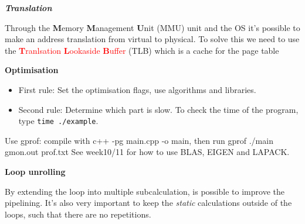 \documentclass[fontsize=8pt, a4paper, landscape, fleqn]{scrartcl}
\renewcommand{\section}[1]{%
    \noindent\colorbox{sectioncolor}{%
        \parbox{\dimexpr\columnwidth-2\fboxsep}{\color{white}\textbf{#1}}}%
    \vspace{0.5mm}%
}
\renewcommand{\subsection}[1]{%
    \noindent\colorbox{subsectioncolor}{%
        \parbox{\dimexpr\columnwidth-2\fboxsep}{\color{white}\textbf{#1}}}%
    \vspace{0.5mm}%
}
\renewcommand{\subsubsection}[1]{%
    \noindent\textbf{\textit{\color{subsectioncolor}#1}}%
    \vspace{1mm}%
}
\begin{document}
\begin{multicols*}{3}[\raggedcolumns]

    \subsubsection{Translation}
    Through the \textbf{M}emory \textbf{M}anagement \textbf{U}nit (MMU) unit and the OS it's possible to make an address translation from virtual to physical. To solve this we need to use the \textcolor{red}{\textbf{T}ranlsation \textbf{L}ookaside \textbf{B}uffer} (TLB) which is a cache for the page table
    
    \section{Optimisation}
    \begin{itemize}
        \item First rule: Set the optimisation flags, use algorithms and libraries.
        \item Second rule: Determine which part is slow. To check the time of the program, type \lstinline{time ./example}.
    \end{itemize}
    Use gprof: compile with c++ -pg main.cpp -o main, then run gprof ./main gmon.out \> prof.txt
    See week10/11 for how to use BLAS, EIGEN and LAPACK.
    \subsection{Loop unrolling}
    By extending the loop into multiple subcalculation, is possible to improve the pipelining. It's also very important to keep the \textit{static} calculations outside of the loops, such that there are no repetitions.
    


\end{multicols*}
\end{document}
